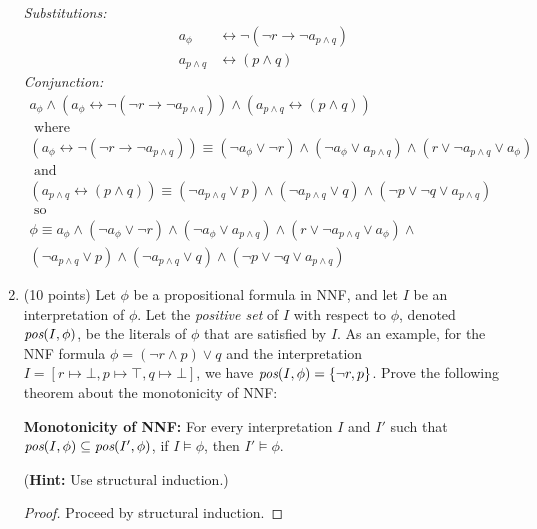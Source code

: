 \documentclass{article}
\newenvironment{solution}{\color{blue} \em }{}
\begin{document}
\begin{enumerate}
\begin{solution}
Substitutions:
\begin{align*}
    a_{\phi} &\leftrightarrow \neg (\neg r \rightarrow \neg a_{p \wedge q}) \\
    a_{p\wedge q} &\leftrightarrow (p \wedge q)
\end{align*}
Conjunction:
\begin{gather*}
    a_{\phi} \wedge (a_{\phi} \leftrightarrow \neg (\neg r \rightarrow \neg a_{p \wedge q})) \land
    (a_{p\wedge q} \leftrightarrow (p \wedge q))
    \\ \text{ where }  \\
    (a_{\phi} \leftrightarrow \neg (\neg r \rightarrow \neg a_{p \wedge q})) \equiv
(\neg a_\phi \lor \neg r) \land (\neg a_\phi \lor a_{p \land q}) \land (r \lor \neg a_{p \land q} \lor a_\phi) \\
    \text{ and } \\
    (a_{p\wedge q} \leftrightarrow (p \wedge q)) \equiv
    (\neg a_{p\wedge q} \lor p ) \land (\neg a_{p\land q} \lor q) \wedge (\neg p \lor \neg q \lor a_{p\wedge q}) \\
    \text{ so } \\
    \phi \equiv
    a_\phi \land
(\neg a_\phi \lor \neg r) \land (\neg a_\phi \lor a_{p \land q}) \land (r \lor \neg a_{p \land q} \lor a_\phi) \land \\
    (\neg a_{p\wedge q} \lor p ) \land (\neg a_{p\land q} \lor q) \wedge (\neg p \lor \neg q \lor a_{p\wedge q})
\end{gather*}

\end{solution}

\item (10 points)  Let $\phi$ be a propositional formula in NNF, and let $I$ be an interpretation of $\phi$. Let the \emph{positive set} of $I$ with respect to $\phi$, denoted $\emph{pos}(I, \phi)$, be the literals of $\phi$ that are satisfied by $I$. As an example, for the NNF formula $\phi = (\neg r \land p) \lor q$ and the interpretation $I = [r \mapsto \bot, p \mapsto \top, q \mapsto \bot]$, we have $\emph{pos}(I, \phi) = \{ \neg r, p \}$. Prove the following theorem about the monotonicity of NNF:

{\bf Monotonicity of NNF:} For every interpretation $I$ and $I'$ such that $\emph{pos}(I, \phi) \subseteq \emph{pos}(I', \phi)$, if $I \models \phi$, then $I' \models \phi$.

(\textbf{Hint:} Use structural induction.) \label{prob:NNF}

\begin{solution}
\begin{proof}
    Proceed by structural induction.


\end{proof}
\end{solution}
\end{enumerate}
\end{document}
